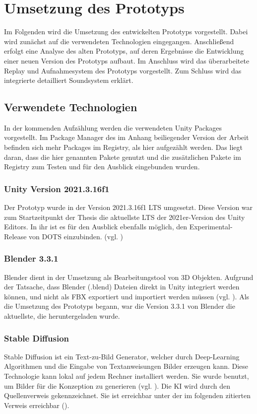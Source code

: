 \chapter{Umsetzung des Prototyps}\label{sec:dev}
Im Folgenden wird die Umsetzung des entwickelten Prototyps vorgestellt. Dabei wird zunächst auf die verwendeten Technologien eingegangen. Anschließend erfolgt eine Analyse des alten Prototyps, auf deren Ergebnisse die Entwicklung einer neuen Version des Prototyps aufbaut. Im Anschluss wird das überarbeitete Replay und Aufnahmesystem des Prototyps vorgestellt. Zum Schluss wird das integrierte detailliert Soundsystem erklärt.

\section{Verwendete Technologien}
In der kommenden Aufzählung werden die verwendeten Unity Packages vorgestellt. Im Package Manager des im Anhang beiliegender Version der Arbeit befinden sich mehr Packages im Registry, als hier aufgezählt werden. Das liegt daran, dass die hier genannten Pakete genutzt und die zusätzlichen Pakete im Registry zum Testen und für den Ausblick eingebunden wurden.

\subsection{Unity Version 2021.3.16f1}
Der Prototyp wurde in der Version 2021.3.16f1 \ac{LTS} umgesetzt. Diese Version war zum Startzeitpunkt der Thesis die aktuellste \ac{LTS} der 2021er-Version des Unity Editors. In ihr ist es für den Ausblick ebenfalls möglich, den Experimental-Release von \ac{DOTS} einzubinden. 
(vgl. \cite{noauthor_official_nodate})

\subsection{Blender 3.3.1}
Blender dient in der Umsetzung als Bearbeitungstool von \ac{3D} Objekten. Aufgrund der Tatsache, dass Blender (.blend) Dateien direkt in Unity integriert werden können, und nicht als \ac{FBX} exportiert und importiert werden müssen (vgl. \cite{technologies_unity_nodate}). Als die Umsetzung des Prototyps begann, war die Version 3.3.1 von Blender die aktuellste, die heruntergeladen wurde.

\subsection{Stable Diffusion}
Stable Diffusion ist ein Text-zu-Bild Generator, welcher durch Deep-Learning Algorithmen und die Eingabe von Textanweisungen Bilder erzeugen kann. Diese Technologie kann lokal auf jedem Rechner installiert werden. Sie wurde benutzt, um Bilder für die Konzeption zu generieren (vgl. \cite{katzlberger_stable_2022}). Die KI wird durch den Quellenverweis  gekennzeichnet. Sie ist erreichbar unter der im folgenden zitierten Verweis erreichbar (\cite{sygil_dev_sygil-devsygil-webui_nodate}).

